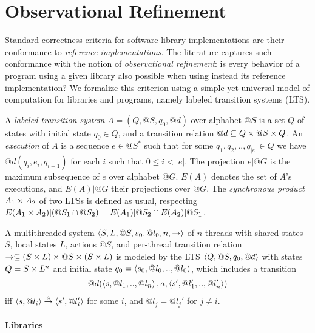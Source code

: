 \section{Observational Refinement}
\label{sec:refinement}

Standard correctness criteria for software library implementations are their
conformance to \emph{reference implementations}. The literature captures such
conformance with the notion of \emph{observational refinement}: is every
behavior of a program using a given library also possible when using instead
its reference implementation? We formalize this criterion using a simple yet
universal model of computation for libraries and programs, namely labeled
transition systems (LTS).

A \emph{labeled transition system} $A = (Q,@S,q_0,@d)$ over alphabet $@S$ is a
set $Q$ of states with initial state $q_0 \in Q$, and a transition relation $@d
\subseteq Q \times @S \times Q$. An \emph{execution} of $A$ is a sequence $e \in @S^*$ such
that for some $q_1, q_2, .., q_{|e|} \in Q$ we have $@d(q_i,e_i,q_{i+1})$ for
each $i$ such that $0 \le i < |e|$. The projection $e|@G$ is the maximum subsequence of $e$
over alphabet $@G$. $E(A)$ denotes the set of $A$'s executions, and $E(A)|@G$
their projections over $@G$. The \emph{synchronous product} $A_1 \times A_2$ of two
LTSs is defined as usual, respecting $E(A_1 \times A_2)|(@S_1 \cap @S_2) =
E(A_1)|@S_2 \cap E(A_2)|@S_1$.

\begin{example}
  \label{ex:threads:1}

  A multithreaded system $\left\langle {S,L,@S,s_0,@l_0,n,->} \right\rangle$ of $n$ threads with
  shared states $S$, local states $L$, actions $@S$, and per-thread transition
  relation $-> \subseteq (S \times L) \times @S \times (S \times L)$ is modeled by the LTS
  $\left\langle {Q,@S,q_0,@d} \right\rangle$ with states $Q = S \times L^n$ and initial state $q_0 =
  \left\langle {s_0, @l_0, .., @l_0} \right\rangle$, which includes a transition
  \begin{align*}
    @d(\left\langle {s, @l_1, .., @l_n} \right\rangle, a, \left\langle {s', @l_1', .., @l_n'} \right\rangle)
  \end{align*}
  iff $\left\langle {s,@l_i} \right\rangle \overset{a}{\rightarrow} \left\langle {s',@l_i'} \right\rangle$ for some $i$, and
  $@l_j = @l_j'$ for $j \neq i$.
  

\end{example}

\paragraph{Libraries}

